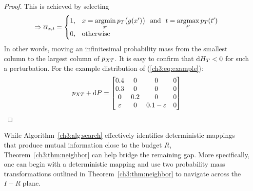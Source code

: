 \begin{proof}
This is achieved by selecting
\begin{align}
    \Rightarrow \overline{\alpha}_{x,t} = 
    \begin{cases}
        1, & x=\operatorname*{argmin}\limits_{x'} {p_T\big(g(x')\big)} \ \text{ and } \ t = \operatorname*{argmax}\limits_{t'} p_T(t')  \\
        0, & \text{otherwise}
    \end{cases}
\end{align}
In other words, moving an infinitesimal probability mass from the smallest column to the largest column of $ p_{XT} $. It is easy to confirm that $\text{d}{H}_T < 0$ for such a perturbation. For the example distribution of (\ref{ch3:eq:example}):
\begin{align}
    p_{XT} + \text{d}{P} = 
    \begin{bmatrix}
        0.4 & 0 & 0 & 0 \\
        0.3 & 0 & 0 & 0 \\
        0 & 0.2 & 0 & 0 \\
        \varepsilon & 0 & 0.1 -\varepsilon & 0 \\
    \end{bmatrix}
\end{align}

\end{proof}

While Algorithm~\ref{ch3:alg:search} effectively identifies deterministic mappings that produce mutual information close to the budget $R$, Theorem~\ref{ch3:thm:neighbor} can help bridge the remaining gap. More specifically, one can begin with a deterministic mapping and use two probability mass transformations outlined in Theorem~\ref{ch3:thm:neighbor} to navigate across the $I-R$ plane. 

